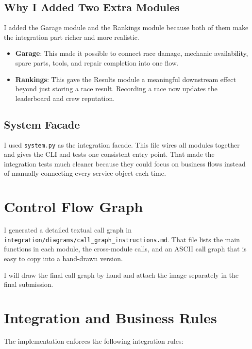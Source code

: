 \documentclass[12pt]{article}
\begin{document}
\subsection{Why I Added Two Extra Modules}
I added the Garage module and the Rankings module because both of them make the integration part richer and more realistic.

\begin{itemize}
  \item \textbf{Garage}: This made it possible to connect race damage, mechanic availability, spare parts, tools, and repair completion into one flow.
  \item \textbf{Rankings}: This gave the Results module a meaningful downstream effect beyond just storing a race result. Recording a race now updates the leaderboard and crew reputation.
\end{itemize}

\subsection{System Facade}
I used \texttt{system.py} as the integration facade. This file wires all modules together and gives the CLI and tests one consistent entry point. That made the integration tests much cleaner because they could focus on business flows instead of manually connecting every service object each time.

\section{Control Flow Graph}
I generated a detailed textual call graph in \texttt{integration/diagrams/call\_graph\_instructions.md}. That file lists the main functions in each module, the cross-module calls, and an ASCII call graph that is easy to copy into a hand-drawn version.

I will draw the final call graph by hand and attach the image separately in the final submission.

\section{Integration and Business Rules}
The implementation enforces the following integration rules:
\end{document}

